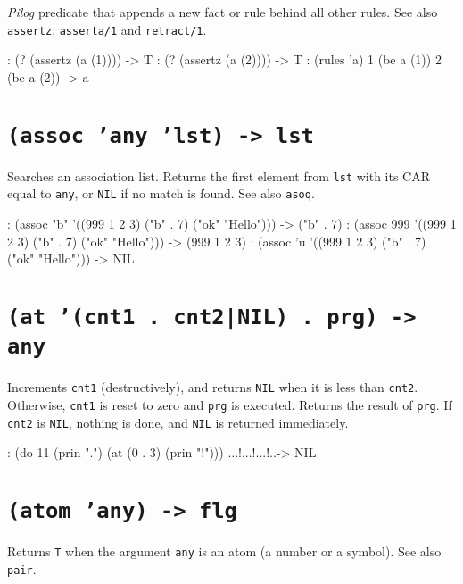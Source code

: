 \emph{Pilog} predicate that appends a new fact or rule
behind all other rules. See also \texttt{assertz}, \texttt{asserta/1} and \texttt{retract/1}.


\begin{wideverbatim}
: (? (assertz (a (1))))
-> T
: (? (assertz (a (2))))
-> T
: (rules 'a)
1 (be a (1))
2 (be a (2))
-> a
\end{wideverbatim}

 
\section*{\texttt{(assoc 'any 'lst) -> lst}}
\label{sec:func-ref-A-(assoc 'any 'lst) -> lst}


Searches an association list. Returns the first element from \texttt{lst} with
its CAR equal to \texttt{any}, or \texttt{NIL} if no match is found. See also \texttt{asoq}.


\begin{wideverbatim}
: (assoc "b" '((999 1 2 3) ("b" . 7) ("ok" "Hello")))
-> ("b" . 7)
: (assoc 999 '((999 1 2 3) ("b" . 7) ("ok" "Hello")))
-> (999 1 2 3)
: (assoc 'u '((999 1 2 3) ("b" . 7) ("ok" "Hello")))
-> NIL
\end{wideverbatim}

 
\section*{\texttt{(at '(cnt1 . cnt2|NIL) . prg) -> any}}
\label{sec:func-ref-A-(at '(cnt1 . cnt2|NIL) . prg) -> any}


Increments \texttt{cnt1} (destructively), and returns \texttt{NIL} when it is less
than \texttt{cnt2}. Otherwise, \texttt{cnt1} is reset to zero and \texttt{prg} is executed.
Returns the result of \texttt{prg}. If \texttt{cnt2} is \texttt{NIL}, nothing is done, and
\texttt{NIL} is returned immediately.


\begin{wideverbatim}
: (do 11 (prin ".") (at (0 . 3) (prin "!")))
...!...!...!..-> NIL
\end{wideverbatim}

 
\section*{\texttt{(atom 'any) -> flg}}
\label{sec:func-ref-A-(atom 'any) -> flg}


Returns \texttt{T} when the argument \texttt{any} is an atom (a number or a symbol).
See also \texttt{pair}.


